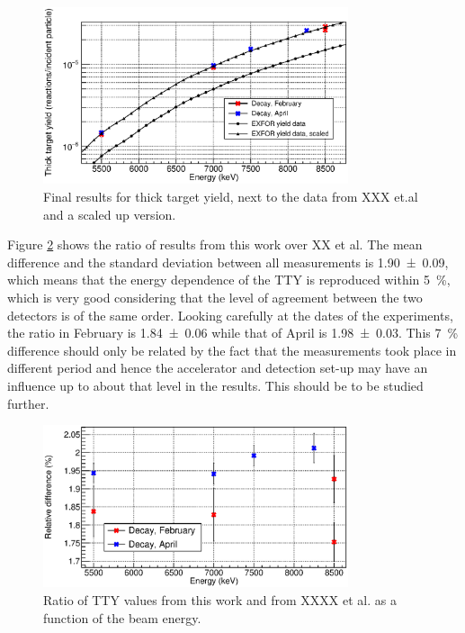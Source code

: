 \documentclass[a4paper,12pt]{report}
\begin{document}
\begin{figure}[H]
	\centering
	\includegraphics[width=0.80\textwidth]{activation_final_results.eps}	%
	\caption{Final results for thick target yield, next to the data from XXX et.al and a scaled up version.}	%
	\label{activation_final_results}
\end{figure}

Figure \ref{activation_result_diffs} shows the ratio of results from this work over XX et al.
The mean difference and the standard deviation between all measurements is \num{1.90(9)}, which means that the energy dependence of the TTY is reproduced within \qty{5}{\percent}, which is very good considering that the level of agreement between the two detectors is of the same order.
Looking carefully at the dates of the experiments, the ratio in February is \num{1.84(6)} while that of April is \num{1.98(3)}.
This \qty{7}{\percent} difference should only be related by the fact that the measurements took place in different period and hence the accelerator and detection set-up may have an influence up to about that level in the results.
This should be to be studied further.

\begin{figure}[H]
	\centering
	\includegraphics[width=0.80\textwidth]{activation_result_diffs.eps}	%
	\caption{Ratio of TTY values from this work and from XXXX et al. as a function of the beam energy.}	%
	\label{activation_result_diffs}
\end{figure}
\end{document}
